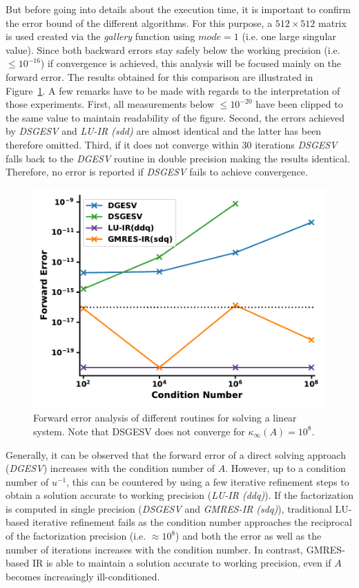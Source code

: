 \noindent But before going into details about the execution time, it is important to confirm the error bound of the different algorithms. For this purpose, a $512 \times 512$ matrix is used created via the \textit{gallery} function using $mode = 1$ (i.e. one large singular value). Since both backward errors stay safely below the working precision (i.e. $\leq 10^{-16}$) if convergence is achieved, this analysis will be focused mainly on the forward error. The results obtained for this comparison are illustrated in Figure~\hyperref[fig:ir3_ac]{\ref{fig:ir3_ac}}. A few remarks have to be made with regards to the interpretation of those experiments. First, all measurements below $\leq 10^{-20}$ have been clipped to the same value to maintain readability of the figure. Second, the errors achieved by \textit{DSGESV} and \textit{LU-IR (sdd)} are almost identical and the latter has been therefore omitted. Third, if it does not converge within 30 iterations \textit{DSGESV} falls back to the \textit{DGESV} routine in double precision making the results identical. Therefore, no error is reported if \textit{DSGESV} fails to achieve convergence.

\begin{figure}[h]
    \centering
    \includegraphics[width=0.7\linewidth]{chapters/5_experiments/figures/IR3_acc.pdf}
    \caption[IR - Forward Error 1]{Forward error analysis of different routines for solving a linear system. Note that DSGESV does not converge for $\kappa_\infty(A)=10^8$.}
    \label{fig:ir3_ac}
\end{figure}

Generally, it can be observed that the forward error of a direct solving approach (\textit{DGESV}) increases with the condition number of $A$. However, up to a condition number of $u^{-1}$, this can be countered by using a few iterative refinement steps to obtain a solution accurate to working precision (\textit{LU-IR (ddq)}). If the factorization is computed in single precision (\textit{DSGESV} and \textit{GMRES-IR (sdq)}), traditional LU-based iterative refinement fails as the condition number approaches the reciprocal of the factorization precision (i.e. $\approx 10^8$) and both the error as well as the number of iterations increases with the condition number. In contrast, GMRES-based IR is able to maintain a solution accurate to working precision, even if $A$ becomes increasingly ill-conditioned.

